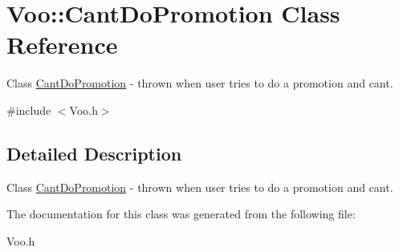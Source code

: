 \hypertarget{class_voo_1_1_cant_do_promotion}{}\section{Voo\+:\+:Cant\+Do\+Promotion Class Reference}
\label{class_voo_1_1_cant_do_promotion}


Class \hyperlink{class_voo_1_1_cant_do_promotion}{Cant\+Do\+Promotion} -\/ thrown when user tries to do a promotion and can\textquotesingle{}t.  




{\ttfamily \#include $<$Voo.\+h$>$}



\subsection{Detailed Description}
Class \hyperlink{class_voo_1_1_cant_do_promotion}{Cant\+Do\+Promotion} -\/ thrown when user tries to do a promotion and can\textquotesingle{}t. 

The documentation for this class was generated from the following file\+:\begin{DoxyCompactItemize}
\item 
Voo.\+h\end{DoxyCompactItemize}
